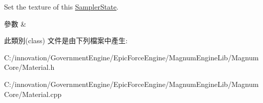 Set the texture of this \hyperlink{class_i_dream_sky_1_1_material_1_1_sampler_state}{Sampler\+State}. 


\begin{DoxyParams}{參數}
{\em } & \\
\hline
\end{DoxyParams}


此類別(class) 文件是由下列檔案中產生\+:\begin{DoxyCompactItemize}
\item 
C\+:/innovation/\+Government\+Engine/\+Epic\+Force\+Engine/\+Magnum\+Engine\+Lib/\+Magnum\+Core/Material.\+h\item 
C\+:/innovation/\+Government\+Engine/\+Epic\+Force\+Engine/\+Magnum\+Engine\+Lib/\+Magnum\+Core/Material.\+cpp\end{DoxyCompactItemize}
